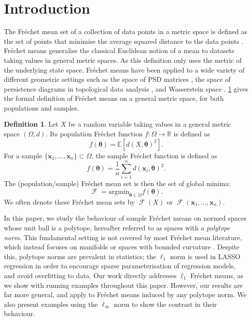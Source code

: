 \documentclass[10pt]{article}
\theoremstyle{definition}
\newtheorem{definition}[theorem]{Definition}
\theoremstyle{remark}
\newcommand{\R}{\mathbb{R}}
\newcommand{\argmin}{\text{argmin}}
\DeclareMathOperator{\FMset}{\mathcal{F}}
\newcommand{\E}{\mathbb{E}}
\renewcommand{\vec}[1]{\mathbf{#1}}
\begin{document}
	
	\section{Introduction}
	The Fr\'echet mean set of a collection of data points in a metric space is defined as the set of points that minimise the average squared distance to the data points \citep{frechet1948elements}. Fr\'echet means generalise the classical Euclidean notion of a mean to datasets taking values in general metric spaces. As this definition only uses the metric of the underlying state space, Fr\'echet means have been applied to a wide variety of different geometric settings such as the space of PSD matrices \citep{arsigny2007geometric,fiori2009learning,petersen2019frechet}, the space of persistence diagrams in topological data analysis \citep{mileyko2011probability,cao2022approximating}, and Wasserstein space \citep{panaretos2020invitation,panaretos2020phase}. \cref{def:frechet_mean} gives the formal definition of Fr\'echet means on a general metric space, for both populations and samples.
	
	\begin{definition}\label{def:frechet_mean}
		Let $X$ be a random variable taking values in a general metric space $(\Omega,d)$. Its population Fr\'echet function $f: \Omega \rightarrow \R$ is defined as
		\[
		f(\vec \theta) = \E \left[ d(X,\vec \theta)^2 \right].
		\]
		For a sample $\{\vec x_1, \dots, \vec x_n\} \subset \Omega$, the sample Fr\'echet function is defined as
		\[
		f(\vec \theta) = \frac{1}{n}\sum_{i = 1}^n d(\vec x_i,\vec \theta)^2.
		\]
		The (population/sample) Fr\'echet mean set is then the set of global minima:
		\[
		\FMset = \argmin_{\vec \theta \in \Omega} f(\vec \theta).
		\]
		We often denote these Fr\'echet mean sets by $\FMset(X)$ or $\FMset(\vec x_1, \dots, \vec x_n)$.
	\end{definition}
	
	In this paper, we study the behaviour of sample Fr\'echet means on normed spaces whose unit ball is a polytope, hereafter referred to as spaces with a \emph{polytope norm}. This fundamental setting is not covered by most Fr\'echet mean literature, which instead focuses on manifolds \citep{BhatPatFMI,BhatPatFMII} or spaces with bounded curvature \citep{SturmHadamard,amendola2024invitation}. Despite this, polytope norms are prevalent in statistics; the $\ell_1$ norm is used in LASSO regression \citep{ranstam2018lasso} in order to encourage sparse parameterisation of regression models, and avoid overfitting to data. Our work directly addresses $\ell_1$ Fr\'echet means, as we show with running examples throughout this paper. However, our results are far more general, and apply to Fr\'echet means induced by any polytope norm. We also present examples using the $\ell_\infty$ norm to show the contrast in their behaviour.
	
\end{document}

